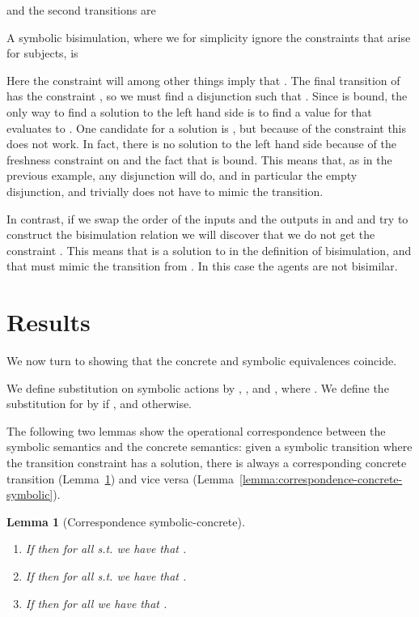 \documentclass{eptcs}
\newtheorem{lemma}[definition]{Lemma}
\theoremstyle{definition}
\begin{document}
and the second transitions are

A symbolic
bisimulation, where we for simplicity ignore the constraints that arise for
subjects, is

Here the constraint  will among other things imply
that . The final transition of 
has the constraint
, so 
we must find a
disjunction  such that
.
Since  is bound, the only way to find a solution to
the left hand side is to find a value for  that evaluates to . One
candidate for a solution is , but
because of the constraint  this does not work. In fact, 
there is no
solution to the left hand side because of the freshness
constraint on  and the fact that  is bound. This means that, as in the previous example, any
disjunction
 will do, and in particular the empty disjunction, and trivially
 does not have to mimic the transition.

In contrast, if we swap the order of the inputs and the outputs in 
and  and try to construct the bisimulation relation we will discover that
we do not get the constraint . This means that 
 is a solution
to  in the definition of bisimulation, and that  must
mimic the transition from . In this case the agents are not bisimilar.

\section{Results}
\label{sec:results}
We now turn to showing that the concrete and symbolic equivalences coincide.


We define substitution on symbolic actions by
,
, and
,
where .
We define the substitution  for 
by
 if , and  otherwise.


The following two lemmas show the operational correspondence between the
symbolic semantics and the concrete semantics: given a symbolic transition
where the transition constraint has a solution, there is
always a corresponding concrete transition
(Lemma~\ref{lemma:correspondence-symbolic-concrete}) and vice versa
(Lemma~\ref{lemma:correspondence-concrete-symbolic}).

\begin{lemma}[Correspondence symbolic-concrete]\mbox{}\\
\label{lemma:correspondence-symbolic-concrete}
\vspace{-1\baselineskip}
\begin{enumerate}
 \item If  then for all  s.t. 
we have that .
\item If  then for all  s.t.  we have that .
\item If  then for all  we have that .
\end{enumerate}
\end{lemma}
\end{document}

